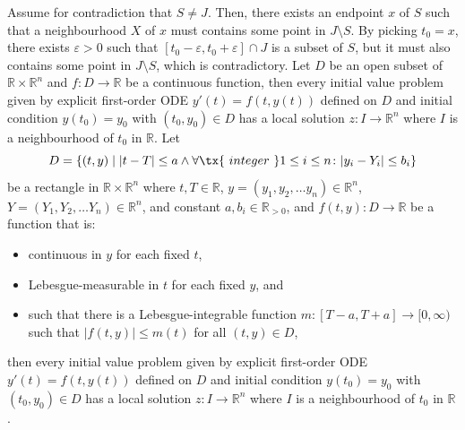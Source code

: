 \documentclass[a4paper,12pt]{report}
\begin{document}
Assume for contradiction that $S\ne J$. Then, there exists an endpoint $x$ of $S$ such that a neighbourhood $X$ of $x$ must contains some point in $J\setminus S$. By picking $t_0=x$, there exists $\varepsilon>0$ such that $[t_0-\varepsilon,t_0+\varepsilon]\cap J$ is a subset of $S$, but it must also contains some point in $J\setminus S$, which is contradictory.
\epr
{}
Let $D$ be an open subset of $\mathbb{R}\times\mathbb{R}^n$ and $f\colon D\to \mathbb {R}$ be a continuous function, then every initial value problem given by explicit first-order ODE $y'(t)=f\left(t,y(t)\right)$ defined on $D$ and initial condition $y\left(t_{0}\right)=y_{0}$ with $(t_{0},y_{0})\in D$ has a local solution $z\colon I\to \mathbb {R}^n$ where $I$ is a neighbourhood of $t_0$ in $\mathbb {R} $.
Let
\[D=\{(t,y)\mid|t-T|\leq a\land\forall\tx{\ integer\ }1\leq i\leq n\colon |y_i-Y_i|\leq b_i\}\]
be a rectangle in $\mathbb{R}\times\mathbb{R}^n$ where $t,T\in\mathbb{R}$, $y=(y_1, y_2,\dots  y_n)\in\mathbb{R}^n$, $Y=(Y_1, Y_2,\dots  Y_n)\in\mathbb{R}^n$, and constant $a,b_i\in\mathbb{R}_{>0}$, and $f(t,y)\colon D\to \mathbb {R}$ be a function that is:
\begin{itemize}
\item continuous in $y$ for each fixed $t$,
\item Lebesgue-measurable in $t$ for each fixed $y$, and
\item such that there is a Lebesgue-integrable function $m\colon [T-a,T+a]\to [0,\infty )$ such that $|f(t,y)|\leq m(t)$ for all $(t,y)\in D$,
\end{itemize}
then every initial value problem given by explicit first-order ODE $y'(t)=f\left(t,y(t)\right)$ defined on $D$ and initial condition $y\left(t_{0}\right)=y_{0}$ with $(t_{0},y_{0})\in D$ has a local solution $z\colon I\to \mathbb {R}^n$ where $I$ is a neighbourhood of $t_0$ in $\mathbb{R}$.
\end{document}
